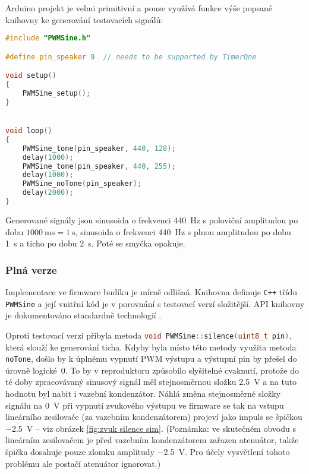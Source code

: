 Arduino projekt  je velmi primitivní a pouze využívá funkce
výše popsané knihovny ke generování testovacích signálů:
\begin{lstlisting}[language=C++,style=numbers]
#include "PWMSine.h"

#define pin_speaker 9  // needs to be supported by TimerOne

void setup()
{
    PWMSine_setup();
}


void loop()
{
    PWMSine_tone(pin_speaker, 440, 128);
    delay(1000);
    PWMSine_tone(pin_speaker, 440, 255);
    delay(1000);
    PWMSine_noTone(pin_speaker);
    delay(2000);
}
\end{lstlisting}
Generované signály jsou sinusoida o frekvenci \SI{440}{\hertz} s poloviční
amplitudou po dobu $\SI{1000}{\milli\second} = \SI{1}{\second}$, sinusoida
o frekvenci \SI{440}{\hertz} s plnou amplitudou po dobu \SI{1}{\second} a ticho
po dobu \SI{2}{\second}. Poté se smyčka opakuje.


\subsubsection{Plná verze}
Implementace ve firmware budíku je mírně odlišná. Knihovna 
definuje \texttt{C++} třídu \texttt{PWMSine} a její vnitřní kód je v porovnání
s testovací verzí složitější. API knihovny je dokumentováno standardně
technologií .

Oproti testovací verzi přibyla metoda
\lstinline[language=C++]!void PWMSine::silence(uint8_t pin)!, \\%
která slouží ke generování ticha.
Kdyby byla místo této metody využita metoda \texttt{noTone},
došlo by k úplnému vypnutí PWM výstupu a výstupní pin by přešel do úrovně
logické~0. To by v reproduktoru způsobilo slyšitelné cvaknutí, protože do té
doby zpracovávaný sinusový signál měl stejnosměrnou složku \SI{2,5}{\volt} a na
tuto hodnotu byl nabit i vazební kondenzátor. Náhlá změna stejnosměrné složky
signálu na \SI{0}{\volt} při vypnutí zvukového výstupu ve firmware se tak na
vstupu lineárního zesilovače (za vazebním kondenzátorem) projeví jako impuls se
špičkou \SI{-2,5}{\volt} -- viz obrázek \vref{fig:zvuk silence sim}. (Poznámka:
ve skutečném obvodu s lineárním zesilovačem je před vazebním kondenzátorem
zařazen atenuátor, takže špička dosahuje pouze zlomku amplitudy
\SI{-2,5}{\volt}. Pro účely vysvětlení tohoto problému ale postačí atenuátor
ignorovat.)

